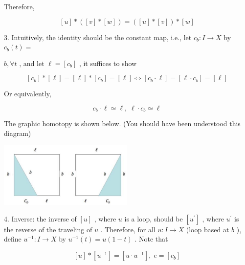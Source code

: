 Therefore,

\[
\left\lbrack  u\right\rbrack   * \left( {\left\lbrack  v\right\rbrack   * \left\lbrack  w\right\rbrack  }\right)  = \left( {\left\lbrack  u\right\rbrack   * \left\lbrack  v\right\rbrack  }\right)  * \left\lbrack  w\right\rbrack
\]

3. Intuitively, the identity should be the constant map, i.e., let \({c}_{b} : I \rightarrow  X\) by \({c}_{b}\left( t\right)  =\)

\(b,\forall t\) , and let \(\ell  = \left\lbrack  {c}_{b}\right\rbrack\) , it suffices to show

\[
\left\lbrack  {c}_{b}\right\rbrack   * \left\lbrack  \ell \right\rbrack   = \left\lbrack  \ell \right\rbrack   * \left\lbrack  {c}_{b}\right\rbrack   = \left\lbrack  \ell \right\rbrack   \Leftrightarrow  \left\lbrack  {{c}_{b} \cdot  \ell }\right\rbrack   = \left\lbrack  {\ell  \cdot  {c}_{b}}\right\rbrack   = \left\lbrack  \ell \right\rbrack
\]

Or equivalently,

\[
{c}_{b} \cdot  \ell  \simeq  \ell ,\;\ell  \cdot  {c}_{b} \simeq  \ell
\]

The graphic homotopy is shown below. (You should have been understood this diagram)

\begin{center}
\includegraphics[max width=0.5\textwidth]{images/bo_d2bcsrref24c73avs720_117_655_468_608_296_0.jpg}
\end{center}
\hspace*{3em} 

4. Inverse: the inverse of \(\left\lbrack  u\right\rbrack\) , where \(u\) is a loop, should be \(\left\lbrack  {u}^{\prime }\right\rbrack\) , where \({u}^{\prime }\) is the reverse of the traveling of \(u\) . Therefore, for all \(u : I \rightarrow  X\) (loop based at \(b\) ), define \({u}^{-1} : I \rightarrow  X\) by \({u}^{-1}\left( t\right)  = u\left( {1 - t}\right)\) . Note that

\[
\left\lbrack  u\right\rbrack   * \left\lbrack  {u}^{-1}\right\rbrack   = \left\lbrack  {u \cdot  {u}^{-1}}\right\rbrack  ,\;e = \left\lbrack  {c}_{b}\right\rbrack
\]

